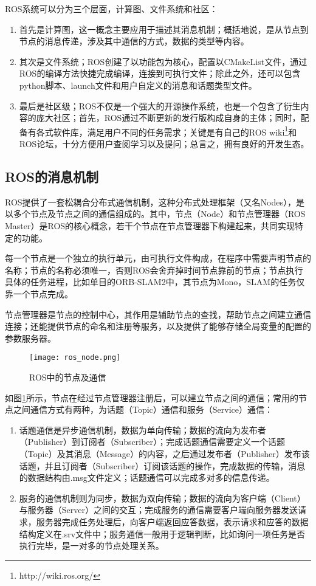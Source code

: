 ROS系统可以分为三个层面，计算图、文件系统和社区：
\begin{enumerate}
	\item 首先是计算图，这一概念主要应用于描述其消息机制；概括地说，是从节点到节点的消息传递，涉及其中通信的方式，数据的类型等内容。
	\item 其次是文件系统；ROS创建了以功能包为核心，配置以CMakeList文件，通过ROS的编译方法快捷完成编译，连接到可执行文件；除此之外，还可以包含python脚本、launch文件和用户自定义的消息和话题类型文件。
	\item 最后是社区级；ROS不仅是一个强大的开源操作系统，也是一个包含了衍生内容的庞大社区；首先，ROS通过不断更新的发行版构成自身的主体；同时，配备有各式软件库，满足用户不同的任务需求；关键是有自己的ROS wiki\footnote[1]{http://wiki.ros.org/}和ROS论坛，十分方便用户查阅学习以及提问；总言之，拥有良好的开发生态。
\end{enumerate}


\subsection{ROS的消息机制} \label{2.1.1}

ROS提供了一套松耦合分布式通信机制，这种分布式处理框架（又名Nodes），是以多个节点及节点之间的通信组成的。其中，节点（Node）和节点管理器（ROS Master）是ROS的核心概念，若干个节点在节点管理器下构建起来，共同实现特定的功能。

每一个节点是一个独立的执行单元，由可执行文件构成，在程序中需要声明节点的名称；节点的名称必须唯一，否则ROS会舍弃掉时间节点靠前的节点；节点执行具体的任务进程，比如单目的ORB-SLAM2中，其节点为Mono，SLAM的任务仅靠一个节点完成。

节点管理器是节点的控制中心，其作用是辅助节点的查找，帮助节点之间建立通信连接；还能提供节点的命名和注册等服务，以及提供了能够存储全局变量的配置的参数服务器。

\begin{figure}[!ht]
\centering
\texttt{[image: ros\_node.png]}
\caption{ROS中的节点及通信} 
\label{fig2}
\end{figure}

如图\ref{fig2}所示，节点在经过节点管理器注册后，可以建立节点之间的通信；常用的节点之间通信方式有两种，为话题（Topic）通信和服务（Service）通信：
\begin{enumerate}
	\item 话题通信是异步通信机制，数据为单向传输；数据的流向为发布者（Publisher）到订阅者（Subscriber）；完成话题通信需要定义一个话题（Topic）及其消息（Message）的内容，之后通过发布者（Publisher）发布该话题，并且订阅者（Subscriber）订阅该话题的操作，完成数据的传输，消息的数据结构由.msg文件定义；话题通信可以完成多对多的信息传递。
	\item 
	服务的通信机制则为同步，数据为双向传输；数据的流向为客户端（Client）与服务器（Server）之间的交互；完成服务的通信需要客户端向服务器发送请求，服务器完成任务处理后，向客户端返回应答数据，表示请求和应答的数据结构定义在.srv文件中；服务通信一般用于逻辑判断，比如询问一项任务是否执行完毕，是一对多的节点处理关系。
\end{enumerate}

